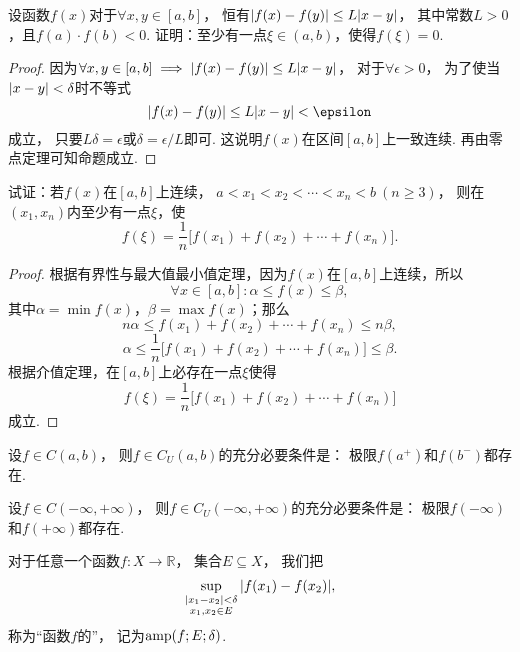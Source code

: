 \begin{example}
设函数\(f(x)\)对于\(\forall x,y \in [a,b]\)，
恒有\(\abs{f(x) - f(y)} \leq L \abs{x - y}\)，
其中常数\(L > 0\)，且\(f(a) \cdot f(b) < 0\).
证明：至少有一点\(\xi \in (a,b)\)，使得\(f(\xi) = 0\).
\begin{proof}
因为\(\forall x,y \in [a,b] \implies \abs{f(x) - f(y)} \leq L \abs{x - y}\)，
对于\(\forall \epsilon > 0\)，
为了使当\(\abs{x - y} < \delta\)时不等式\[
\abs{f(x) - f(y)} \leq L \abs{x - y} < \epsilon
\]成立，
只要\(L \delta = \epsilon\)或\(\delta = \epsilon / L\)即可.
这说明\(f(x)\)在区间\([a,b]\)上一致连续.
再由零点定理可知命题成立.
\end{proof}
\end{example}

\begin{example}
试证：若\(f(x)\)在\([a,b]\)上连续，
\(a < x_1 < x_2 < \dotsb < x_n < b \ (n \geq 3)\)，
则在\((x_1,x_n)\)内至少有一点\(\xi\)，使\[
f(\xi) = \frac{1}{n} \bigl[
	f(x_1) + f(x_2) + \dotsb + f(x_n)
\bigr].
\]
\begin{proof}
根据有界性与最大值最小值定理，因为\(f(x)\)在\([a,b]\)上连续，所以\[
\forall x \in [a,b] :
	\alpha \leq f(x) \leq \beta,
\]其中\(\alpha = \min f(x)\)，\(\beta = \max f(x)\)；那么\[
n \alpha \leq f(x_1) + f(x_2) + \dotsb + f(x_n) \leq n \beta,
\]\[
\alpha \leq \frac{1}{n} \bigl[f(x_1) + f(x_2) + \dotsb + f(x_n)\bigr] \leq \beta.
\]根据介值定理，在\([a,b]\)上必存在一点\(\xi\)使得\[
f(\xi) = \frac{1}{n} \bigl[ f(x_1) + f(x_2) + \dotsb + f(x_n) \bigr]
\]成立.
\end{proof}
\end{example}

\begin{theorem}\label{theorem:极限.闭区间上连续函数的性质.开区间上的连续函数一致连续的充分必要条件1}
设\(f \in C(a,b)\)，
则\(f \in C_U(a,b)\)的充分必要条件是：
极限\(f(a^+)\)和\(f(b^-)\)都存在.
\end{theorem}

\begin{theorem}\label{theorem:极限.闭区间上连续函数的性质.开区间上的连续函数一致连续的充分必要条件2}
设\(f \in C(-\infty,+\infty)\)，
则\(f \in C_U(-\infty,+\infty)\)的充分必要条件是：
极限\(f(-\infty)\)和\(f(+\infty)\)都存在.
\end{theorem}

\begin{definition}
对于任意一个函数\(f\colon X\to\mathbb{R}\)，
集合\(E \subseteq X\)，
我们把\[
	\sup_{\substack{
		\abs{x_1-x_2}<\delta \\
		x_1,x_2 \in E
	}}\abs{f(x_1)-f(x_2)},
\]
称为“函数\(f\)的”，
记为\(\operatorname{amp}(f;E;\delta)\).
\end{definition}

